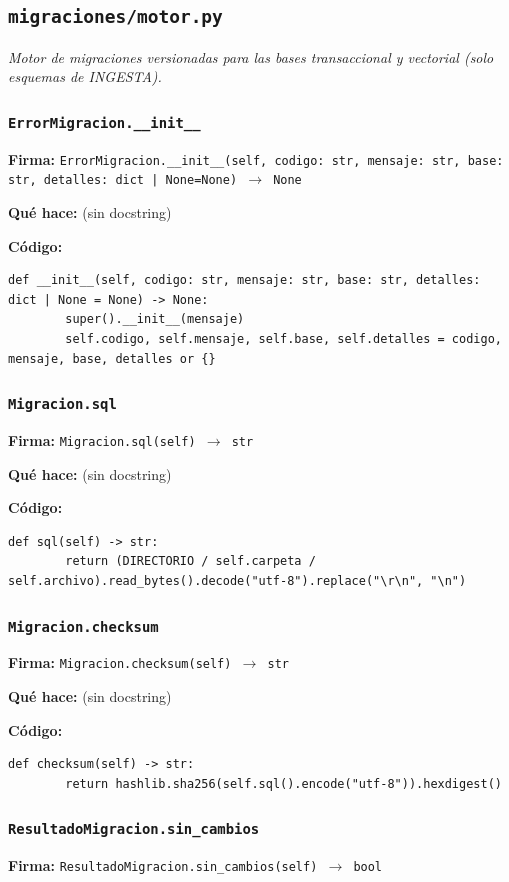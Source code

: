 \documentclass[11pt,a4paper]{article}
\begin{document}
\subsection{\texttt{migraciones/motor.py}}
\textit{Motor de migraciones versionadas para las bases transaccional y vectorial (solo esquemas de INGESTA).}

\subsubsection*{\texttt{ErrorMigracion.\_\_init\_\_}}
\textbf{Firma:} \texttt{ErrorMigracion.\_\_init\_\_(self, codigo: str, mensaje: str, base: str, detalles: dict | None=None) $\rightarrow$ None}

\textbf{Qué hace:} (sin docstring)

\textbf{Código:}
\begin{lstlisting}
def __init__(self, codigo: str, mensaje: str, base: str, detalles: dict | None = None) -> None:
        super().__init__(mensaje)
        self.codigo, self.mensaje, self.base, self.detalles = codigo, mensaje, base, detalles or {}
\end{lstlisting}

\subsubsection*{\texttt{Migracion.sql}}
\textbf{Firma:} \texttt{Migracion.sql(self) $\rightarrow$ str}

\textbf{Qué hace:} (sin docstring)

\textbf{Código:}
\begin{lstlisting}
def sql(self) -> str:
        return (DIRECTORIO / self.carpeta / self.archivo).read_bytes().decode("utf-8").replace("\r\n", "\n")
\end{lstlisting}

\subsubsection*{\texttt{Migracion.checksum}}
\textbf{Firma:} \texttt{Migracion.checksum(self) $\rightarrow$ str}

\textbf{Qué hace:} (sin docstring)

\textbf{Código:}
\begin{lstlisting}
def checksum(self) -> str:
        return hashlib.sha256(self.sql().encode("utf-8")).hexdigest()
\end{lstlisting}

\subsubsection*{\texttt{ResultadoMigracion.sin\_cambios}}
\textbf{Firma:} \texttt{ResultadoMigracion.sin\_cambios(self) $\rightarrow$ bool}
\end{document}
